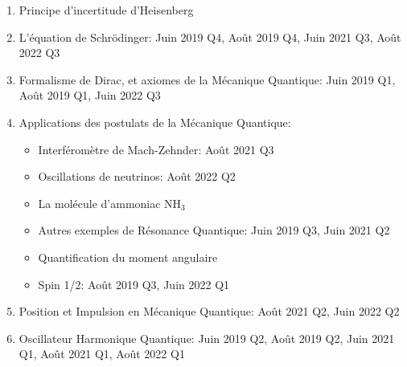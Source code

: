\documentclass[a4paper,10pt]{book}
\begin{document}
\begin{enumerate}
    \item Principe d'incertitude d'Heisenberg
    \item L'équation de Schrödinger: Juin 2019 Q4, Août 2019 Q4, Juin 2021 Q3, Août 2022 Q3
    \item Formalisme de Dirac, et axiomes de la Mécanique Quantique: Juin 2019 Q1, Août 2019 Q1, Juin 2022 Q3
    \item Applications des postulats de la Mécanique Quantique: 
    \begin{itemize}[label=\textbullet]
        \item Interféromètre de Mach-Zehnder: Août 2021 Q3
        \item Oscillations de neutrinos: Août 2022 Q2
        \item La molécule d'ammoniac $\text{NH}_3$
        \item Autres exemples de Résonance Quantique: Juin 2019 Q3, Juin 2021 Q2
        \item Quantification du moment angulaire
        \item Spin 1/2: Août 2019 Q3, Juin 2022 Q1
    \end{itemize}
    \item Position et Impulsion en Mécanique Quantique: Août 2021 Q2, Juin 2022 Q2
    \item Oscillateur Harmonique Quantique: Juin 2019 Q2, Août 2019 Q2, Juin 2021 Q1, Août 2021 Q1, Août 2022 Q1
\end{enumerate}












\end{document}
